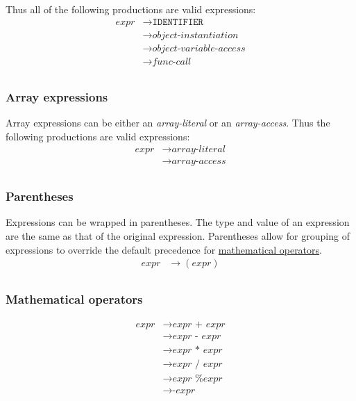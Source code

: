 \documentclass{article}
\begin{document}
Thus all of the following productions are valid expressions:
\begin{align*}
    \textit{expr} &\to \texttt{IDENTIFIER} \\
    &\to \hyperref[sec:object-instantiation]{\textit{object-instantiation}} \\
    &\to \hyperref[sec:object-variable-access]{\textit{object-variable-access}} \\
    &\to \hyperref[sec:func-call]{\textit{func-call}} \\
\end{align*}

\subsubsection{Array expressions}
Array expressions can be either an \textit{array-literal} or an \textit{array-access}. Thus the following productions are valid expressions:
\begin{align*}
    \textit{expr} &\to \hyperref[sec:array-literal]{\textit{array-literal}} \\
    &\to \hyperref[sec:array-access]{\textit{array-access}} \\
\end{align*}

\subsubsection{Parentheses}
Expressions can be wrapped in parentheses. The type and value of an expression are the same as that of the original expression. Parentheses allow for grouping of expressions to override the default precedence for \hyperref[sec:expr-mathematical-operators]{mathematical operators}.
\begin{align*}
    \textit{expr} &\to (\hyperref[sec:expr]{\textit{expr}}) \\
\end{align*}

\subsubsection{Mathematical operators}
\label{sec:expr-mathematical-operators}
\begin{align*}
    \textit{expr} &\to \hyperref[sec:expr]{\textit{expr}} \texttt{ + } \hyperref[sec:expr]{\textit{expr}} \\
    &\to \hyperref[sec:expr]{\textit{expr}} \texttt{ - } \hyperref[sec:expr]{\textit{expr}} \\
    &\to \hyperref[sec:expr]{\textit{expr}} \texttt{ * } \hyperref[sec:expr]{\textit{expr}} \\
    &\to \hyperref[sec:expr]{\textit{expr}} \texttt{ / } \hyperref[sec:expr]{\textit{expr}} \\
    &\to \hyperref[sec:expr]{\textit{expr}} \texttt{ \% } \hyperref[sec:expr]{\textit{expr}} \\
    &\to \texttt{-}\hyperref[sec:expr]{\textit{expr}} \\
\end{align*}
\end{document}
